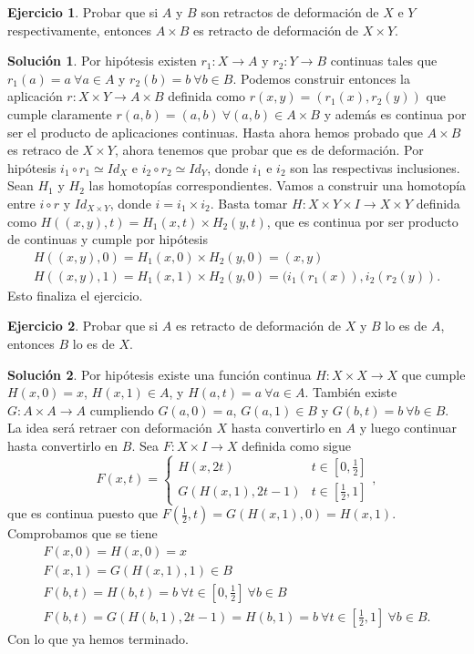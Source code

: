 \documentclass{article}
\theoremstyle{plain}
\theoremstyle{definition}
\newtheorem{exercise}{Ejercicio}
\newtheorem*{sol*}{Solución}
\begin{document}
\newpage
\begin{exercise}
Probar que si $A$ y $B$ son retractos de deformación de $X$ e $Y$ respectivamente, entonces $A\times B$ es retracto de deformación de $X\times Y$.
\end{exercise}
\begin{sol*}
Por hipótesis existen $r_1:X\to A$ y $r_2:Y\to B$ continuas tales que $r_1(a)=a\ \forall a\in A$ y $r_2(b)=b\ \forall b\in B$. Podemos construir entonces la aplicación $r:X\times Y\to A\times B$ definida como $r(x,y)=(r_1(x),r_2(y))$ que cumple claramente $r(a,b)=(a,b)\ \forall (a,b)\in A\times B$ y además es continua por ser el producto de aplicaciones continuas. Hasta ahora hemos probado que $A\times B$ es retraco de $X\times Y$, ahora tenemos que probar que es de deformación. Por hipótesis $i_1\circ r_1\simeq Id_X$ e $i_2\circ r_2\simeq Id_Y$, donde $i_1$ e $i_2$ son las respectivas inclusiones. Sean $H_1$ y $H_2$ las homotopías correspondientes. Vamos a construir una homotopía entre $i\circ r$ y $Id_{X\times Y}$, donde $i=i_1\times i_2$. Basta tomar $H:X\times Y\times I\to X\times Y$ definida como $H((x,y),t)=H_1(x,t)\times H_2(y,t)$, que es continua por ser producto de continuas y cumple por hipótesis
\begin{gather*}
H((x,y),0)=H_1(x,0)\times H_2(y,0)= (x,y)\\
H((x,y),1)=H_1(x,1)\times H_2(y,0)= (i_1(r_1(x)),i_2(r_2(y)).
\end{gather*}
Esto finaliza el ejercicio.
\end{sol*}
\newpage
\begin{exercise}
Probar que si $A$ es retracto de deformación de $X$ y $B$ lo es de $A$, entonces $B$ lo es de $X$. 
\end{exercise}
\begin{sol*}
Por hipótesis existe una función continua $H:X\times X\to X$ que cumple $H(x,0)=x$, $H(x,1)\in A$, y $H(a,t)=a\ \forall a\in A$. También existe $G:A\times A\to A$ cumpliendo $G(a,0)=a$, $G(a,1)\in B$ y $G(b,t)=b\ \forall b\in B$. La idea será retraer con deformación $X$ hasta convertirlo en $A$ y luego continuar hasta convertirlo en $B$. Sea $F:X\times I\to X$ definida como sigue
\[
F(x,t)=\begin{cases}
H(x,2t) & t\in[0,\frac{1}{2}]\\
G(H(x,1),2t-1) & t\in[\frac{1}{2},1]
\end{cases},
\]
que es continua puesto que $F(\frac{1}{2},t)=G(H(x,1),0)=H(x,1)$. Comprobamos que se tiene
\begin{gather*}
F(x,0)=H(x,0)=x\\
F(x,1)=G(H(x,1),1)\in B\\
F(b,t)=H(b,t)=b\ \forall t\in [0,\frac{1}{2}]\ \forall b\in B\\
F(b,t)=G(H(b,1),2t-1)=H(b,1)=b\ \forall t\in[\frac{1}{2},1] \ \forall b\in B.
\end{gather*}
Con lo que ya hemos terminado. 
\end{sol*}
\end{document}

